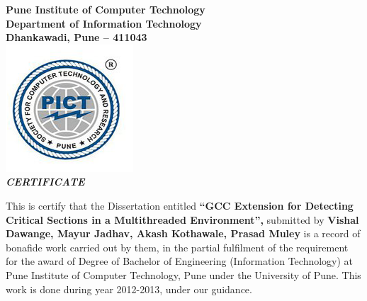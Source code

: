 \begin{center}
\thispagestyle{empty}

\LARGE{\textbf{Pune Institute of Computer Technology}} \\
\large{\textbf{Department of Information Technology}}\\
\large{\textbf{Dhankawadi, Pune – 411043}}\\[0.5cm]

\includegraphics[scale=0.5]{pict_logo}\\[0.5cm]

{\Huge \textbf{\emph{CERTIFICATE}}}\\[0.5cm]
\end{center}
\linespread{1.13}
\large{This is certify that the Dissertation entitled
\textbf{``GCC Extension for Detecting Critical Sections in a Multithreaded Environment'',}
submitted by
\textbf{Vishal Dawange, Mayur Jadhav, Akash Kothawale, Prasad Muley}
 is a record of bonafide work carried out by them, in the partial
 fulfilment of the requirement for the award of Degree of Bachelor of
 Engineering (Information Technology) at Pune Institute of Computer
 Technology, Pune under the University of Pune. This work is done
 during year 2012-2013, under our guidance.}\\[1.0cm]




